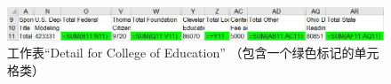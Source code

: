 \begin{figure}[tbp]
    \centering
    \includegraphics[width = \columnwidth]{figure/figure7.jpeg}
    \caption{工作表“Detail for College of Education” （包含一个绿色标记的单元格类）}
    \label{figure7}
\end{figure}